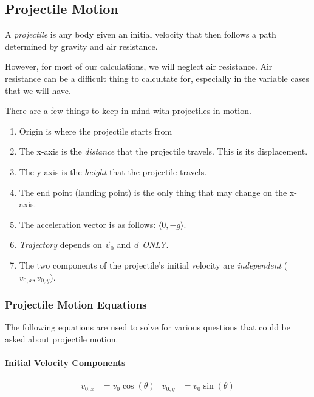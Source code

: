 \subsection{Projectile Motion}\label{subsec:Projectile Motion}
\begin{definition}[Projectile]\label{def:Projectile}
  A \emph{projectile} is any body given an initial velocity that then follows a path determined by gravity and air resistance.
  \begin{remark}
    However, for most of our calculations, we will neglect air resistance.
    Air resistance can be a difficult thing to calcultate for, especially in the variable cases that we will have.
  \end{remark}
\end{definition}

There are a few things to keep in mind with projectiles in motion.
\begin{enumerate}
  \item Origin is where the projectile starts from
  \item The x-axis is the \emph{distance} that the projectile travels. This is its displacement.
  \item The y-axis is the \emph{height} that the projectile travels.
  \item The end point (landing point) is the only thing that may change on the x-axis.
  \item The acceleration vector is as follows: $\langle 0, -g \rangle$.
  \item \emph{Trajectory} depends on $\vec{v}_{0}$ and $\vec{a}$ \emph{ONLY}.
  \item The two components of the projectile's initial velocity are \emph{independent} ($v_{0,x}, v_{0,y}$).
\end{enumerate}

\subsubsection{Projectile Motion Equations}\label{subsubsec:Projectile Motion Eqns}
The following equations are used to solve for various questions that could be asked about projectile motion.

\paragraph{Initial Velocity Components}\label{par:Projectile Initial Velocity Components}
\begin{equation}\label{eq:Projectile Initial Velocity Components}
  \begin{aligned}
    v_{0,x} &= v_{0} \cos ( \theta ) & v_{0,y} &= v_{0} \sin ( \theta ) \\
  \end{aligned}
\end{equation}

